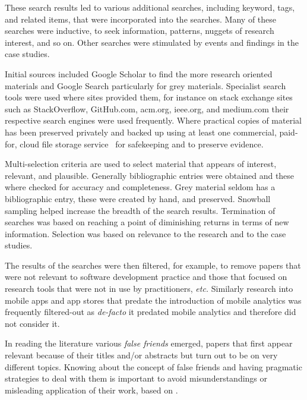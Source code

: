 These search results led to various additional searches, including keyword, tags, and related items, that were incorporated into the searches. Many of these searches were inductive, to seek information, patterns, nuggets of research interest, and so on. Other searches were stimulated by events and findings in the case studies.

Initial sources included Google Scholar to find the more research oriented materials and Google Search particularly for grey materials. Specialist search tools were used where sites provided them, for instance on stack exchange sites such as StackOverflow, GitHub.com, acm.org, ieee.org, and medium.com their respective search engines were used frequently. Where practical copies of material has been preserved privately and backed up using at least one commercial, paid-for, cloud file storage service~ for safekeeping and to preserve evidence.

Multi-selection criteria are used to select material that appears of interest, relevant, and plausible. Generally bibliographic entries were obtained and these where checked for accuracy and completeness. Grey material seldom has a bibliographic entry, these were created by hand, and preserved. Snowball sampling helped increase the breadth of the search results. Termination of searches was based on reaching a point of diminishing returns in terms of new information. Selection was based on relevance to the research and to the case studies.

The results of the searches were then filtered, for example, to remove papers that were not relevant to software development practice and those that focused on research tools that were not in use by practitioners, \emph{etc.} Similarly research into mobile apps and app stores that predate the introduction of mobile analytics was frequently filtered-out as \emph{de-facto} it predated mobile analytics and therefore did not consider it.

In reading the literature various \textit{false friends} emerged, papers that first appear relevant because of their titles and/or abstracts but turn out to be on very different topics. 
Knowing about the concept of false friends and having pragmatic strategies to deal with them is important to avoid misunderstandings or misleading application of their work, 
based on . 

